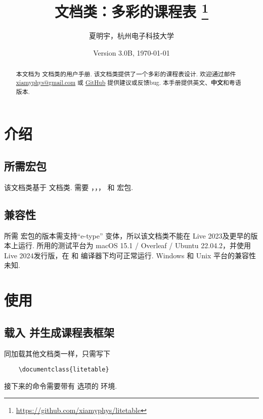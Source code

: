\documentclass[letterpaper]{l3doc}
\title{
    \cls{litetable} 文档类：多彩的课程表
    \thanks{\url{https://github.com/xiamyphys/litetable}}
}
\author{夏明宇，杭州电子科技大学}
\affil{\href{mailto:xiamyphys@gmail.com}{xiamyphys@gmail.com}}
\date{Version 3.0B, \today}
\begin{document}
\maketitle

\begin{abstract}
    本文档为  文档类的用户手册. 该文档类提供了一个多彩的课程表设计. 欢迎通过邮件 \href{mailto:xiamyphys@gmail.com}{xiamyphys@gmail.com} 或 \href{https://github.com/xiamyphys/litetable/issues}{GitHub} 提供建议或反馈bug. 本手册提供英文、\textbf{中文}和粤语版本.
\end{abstract}

\section{介绍}

\subsection{所需宏包}

该文档类基于  文档类. 需要 ，，， 和  宏包. 

\subsection{兼容性}

所需  宏包的版本需支持``e-type'' 变体，所以该文档类不能在 Live 2023及更早的版本上运行. 所用的测试平台为 macOS 15.1 / Overleaf / Ubuntu 22.04.2，并使用 Live 2024发行版，在  和  编译器下均可正常运行. Windows 和 Unix 平台的兼容性未知.

\section{使用}

\subsection{载入  并生成课程表框架}

同加载其他文档类一样，只需写下

\begin{Verbatim}
    \documentclass{litetable}
\end{Verbatim}

接下来的命令需要带有  选项的  环境.
\end{document}
